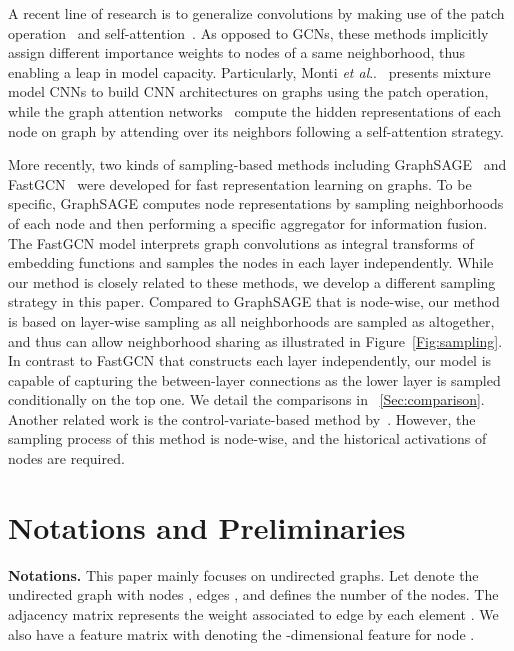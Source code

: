 \documentclass{article}
\makeatletter
\DeclareRobustCommand\onedot{\futurelet\@let@token\@onedot}
\def\@onedot{\ifx\@let@token.\else.\null\fi\xspace}
\def\etal{\emph{et al}\onedot}
\makeatother
\begin{document}
A recent line of research is to generalize convolutions by making use of the patch operation~\cite{monti2017geometric} and self-attention~\cite{velivckovic2017graph}. As opposed to GCNs, these methods implicitly assign different importance weights to nodes of a same neighborhood, thus enabling a leap in model capacity. Particularly, Monti \etal~\cite{monti2017geometric} presents mixture model CNNs to build CNN architectures on graphs using the patch operation, while the graph attention networks~\cite{velivckovic2017graph} compute the hidden representations of each node on graph by attending over its neighbors following a self-attention strategy.

More recently, two kinds of sampling-based methods including GraphSAGE~\cite{hamilton2017inductive} and FastGCN~\cite{chen2018fastgcn} were developed for fast representation learning on graphs. To be specific, GraphSAGE computes node representations by sampling neighborhoods of each node and then performing a specific aggregator for information fusion. The FastGCN model interprets graph convolutions as integral transforms of embedding functions and samples the nodes in each layer independently.
While our method is closely related to these methods, we develop a different sampling strategy in this paper. Compared to GraphSAGE that is node-wise, our method is based on layer-wise sampling as all neighborhoods are sampled as altogether, and thus can allow neighborhood sharing as illustrated in Figure~\ref{Fig:sampling}. In contrast to FastGCN that constructs each layer independently, our model is capable of capturing the between-layer connections as the lower layer is sampled conditionally on the top one. We detail the comparisons in \textsection~\ref{Sec:comparison}. Another related work is the control-variate-based method by~\cite{jianfei2018stochastic}. However, the sampling process of this method is node-wise, and the historical activations of nodes are required.



\section{Notations and Preliminaries}
\textbf{Notations.} This paper mainly focuses on undirected graphs. Let  denote the undirected graph with nodes , edges , and  defines the number of the nodes. The adjacency matrix  represents the weight associated to edge  by each element . We also have a feature matrix  with  denoting the -dimensional feature for node .
\end{document}
